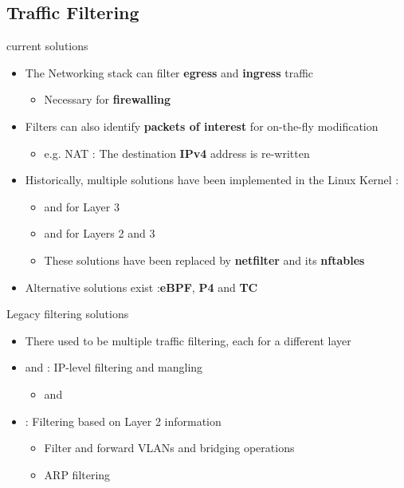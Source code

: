 \subsection{Traffic Filtering}

\begin{frame}{current solutions}
	\begin{itemize}
		\item The Networking stack can filter \textbf{egress} and \textbf{ingress} traffic
			\begin{itemize}
				\item Necessary for \textbf{firewalling}
			\end{itemize}
		\item Filters can also identify \textbf{packets of interest} for on-the-fly modification
			\begin{itemize}
				\item e.g. NAT : The destination \textbf{IPv4} address is re-written
			\end{itemize}
		\item Historically, multiple solutions have been implemented in the Linux Kernel :
			\begin{itemize}
				\item {} and  for Layer 3
				\item {} and  for Layers 2 and 3
				\item These solutions have been replaced by \textbf{netfilter} and its \textbf{nftables}
			\end{itemize}
		\item Alternative solutions exist :\textbf{eBPF}, \textbf{P4} and \textbf{TC}
	\end{itemize}
\end{frame}

\begin{frame}{Legacy filtering solutions}
	\begin{itemize}
		\item There used to be multiple traffic filtering, each for a different layer
		\item {} and  : IP-level filtering and mangling
			\begin{itemize}
				\item {} and 
			\end{itemize}
		\item {} : Filtering based on Layer 2 information
			\begin{itemize}
				\item Filter and forward VLANs and bridging operations
				\item ARP filtering
			\end{itemize}
	\end{itemize}
\end{frame}

